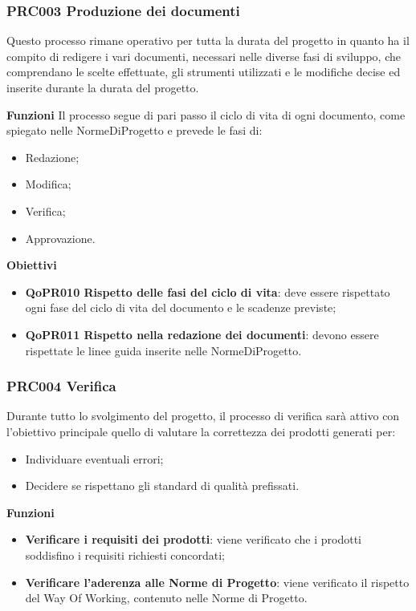\documentclass[../piano-di-qualifica.tex]{subfiles}
\begin{document}
\subsubsection{PRC003 Produzione dei documenti}
\label{sub:produzione_dei_documenti}
Questo processo rimane operativo per tutta la durata del progetto in quanto ha il compito di redigere i vari documenti, necessari nelle diverse fasi di sviluppo, che comprendano le scelte effettuate, gli strumenti utilizzati e le modifiche decise ed inserite durante la durata del progetto.

\textbf{Funzioni}
Il processo segue di pari passo il ciclo di vita di ogni documento, come spiegato nelle NormeDiProgetto e prevede le fasi di:
\begin{itemize}
    \item Redazione;
    \item Modifica;
    \item Verifica;
    \item Approvazione.        
\end{itemize}

\textbf{Obiettivi}
\begin{itemize}
    \item \textbf{QoPR010 Rispetto delle fasi del ciclo di vita}: deve essere rispettato ogni fase del ciclo di vita del documento e le scadenze previste;
    \item \textbf{QoPR011 Rispetto nella redazione dei documenti}: devono essere rispettate le linee guida inserite nelle NormeDiProgetto.
\end{itemize}

\subsubsection{PRC004 Verifica}
\label{sub:produzione_dei_documenti}
Durante tutto lo svolgimento del progetto, il processo di verifica sarà attivo con l'obiettivo principale quello di valutare la correttezza dei prodotti generati per: 
\begin{itemize}
    \item Individuare eventuali errori;
    \item Decidere se rispettano gli standard di qualità prefissati.
\end{itemize}

\textbf{Funzioni}
\begin{itemize}
    \item \textbf{Verificare i requisiti dei prodotti}: viene verificato che i prodotti soddisfino i requisiti richiesti concordati;
    \item \textbf{Verificare l'aderenza alle Norme di Progetto}: viene verificato il rispetto del Way Of Working, contenuto nelle Norme di Progetto.
\end{itemize}
\end{document}
